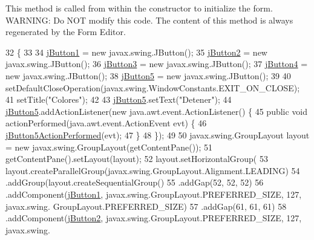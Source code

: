 This method is called from within the constructor to initialize the form. W\+A\+R\+N\+I\+NG\+: Do N\+OT modify this code. The content of this method is always regenerated by the Form Editor. 
\begin{DoxyCode}
32                                   \{
33 
34         \mbox{\hyperlink{class_r_m_i_1_1_colores_add77873c88866ea978fcad21ad2eda75}{jButton1}} = \textcolor{keyword}{new} javax.swing.JButton();
35         \mbox{\hyperlink{class_r_m_i_1_1_colores_ad8deec15488def53e7a4e617ae4253ad}{jButton2}} = \textcolor{keyword}{new} javax.swing.JButton();
36         \mbox{\hyperlink{class_r_m_i_1_1_colores_a2ca1cf1514d7f93a94808c3c4d8f19e7}{jButton3}} = \textcolor{keyword}{new} javax.swing.JButton();
37         \mbox{\hyperlink{class_r_m_i_1_1_colores_a07351e661898a4b3c4a1b0abae7fcbb5}{jButton4}} = \textcolor{keyword}{new} javax.swing.JButton();
38         \mbox{\hyperlink{class_r_m_i_1_1_colores_a20b401d6acdf13f51e984d95c4697d90}{jButton5}} = \textcolor{keyword}{new} javax.swing.JButton();
39 
40         setDefaultCloseOperation(javax.swing.WindowConstants.EXIT\_ON\_CLOSE);
41         setTitle(\textcolor{stringliteral}{"Colores"});
42 
43         \mbox{\hyperlink{class_r_m_i_1_1_colores_a20b401d6acdf13f51e984d95c4697d90}{jButton5}}.setText(\textcolor{stringliteral}{"Detener"});
44         \mbox{\hyperlink{class_r_m_i_1_1_colores_a20b401d6acdf13f51e984d95c4697d90}{jButton5}}.addActionListener(\textcolor{keyword}{new} java.awt.event.ActionListener() \{
45             \textcolor{keyword}{public} \textcolor{keywordtype}{void} actionPerformed(java.awt.event.ActionEvent evt) \{
46                 \mbox{\hyperlink{class_r_m_i_1_1_colores_a9f457076530e2ee7660ccd9b4c9a1898}{jButton5ActionPerformed}}(evt);
47             \}
48         \});
49 
50         javax.swing.GroupLayout layout = \textcolor{keyword}{new} javax.swing.GroupLayout(getContentPane());
51         getContentPane().setLayout(layout);
52         layout.setHorizontalGroup(
53             layout.createParallelGroup(javax.swing.GroupLayout.Alignment.LEADING)
54             .addGroup(layout.createSequentialGroup()
55                 .addGap(52, 52, 52)
56                 .addComponent(\mbox{\hyperlink{class_r_m_i_1_1_colores_add77873c88866ea978fcad21ad2eda75}{jButton1}}, javax.swing.GroupLayout.PREFERRED\_SIZE, 127, javax.swing.
      GroupLayout.PREFERRED\_SIZE)
57                 .addGap(61, 61, 61)
58                 .addComponent(\mbox{\hyperlink{class_r_m_i_1_1_colores_ad8deec15488def53e7a4e617ae4253ad}{jButton2}}, javax.swing.GroupLayout.PREFERRED\_SIZE, 127, javax.swing.

\end{DoxyCode}
